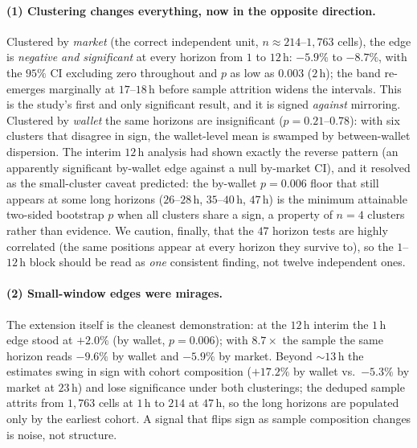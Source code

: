 \documentclass[11pt]{article}
\begin{document}
\paragraph{(1) Clustering changes everything, now in the opposite direction.} Clustered by
\emph{market} (the correct independent unit, $n\approx214$--$1{,}763$ cells), the edge is
\emph{negative and significant} at every horizon from $1$ to $12$\,h: $-5.9\%$ to $-8.7\%$, with
the $95\%$ CI excluding zero throughout and $p$ as low as $0.003$ ($2$\,h); the band re-emerges
marginally at $17$--$18$\,h before sample attrition widens the intervals. This is the study's
first and only significant result, and it is signed \emph{against} mirroring. Clustered by
\emph{wallet} the same horizons are insignificant ($p=0.21$--$0.78$): with six clusters that
disagree in sign, the wallet-level mean is swamped by between-wallet dispersion. The interim
$12$\,h analysis had shown exactly the reverse pattern (an apparently significant by-wallet
edge against a null by-market CI), and it resolved as the small-cluster caveat predicted: the
by-wallet $p=0.006$ floor that still appears at some long horizons ($26$--$28$\,h,
$35$--$40$\,h, $47$\,h) is the minimum attainable two-sided bootstrap $p$ when all clusters
share a sign, a property of $n{=}4$ clusters rather than evidence. We caution, finally, that
the $47$ horizon tests are highly correlated (the same positions appear at every horizon they
survive to), so the $1$--$12$\,h block should be read as \emph{one} consistent finding, not
twelve independent ones.

\paragraph{(2) Small-window edges were mirages.} The extension itself is the cleanest
demonstration: at the $12$\,h interim the $1$\,h edge stood at $+2.0\%$ (by wallet, $p=0.006$);
with $8.7\times$ the sample the same horizon reads $-9.6\%$ by wallet and $-5.9\%$ by market.
Beyond ${\sim}13$\,h the estimates swing in sign with cohort composition ($+17.2\%$ by wallet
vs.\ $-5.3\%$ by market at $23$\,h) and lose significance under both clusterings; the deduped
sample attrits from $1{,}763$ cells at $1$\,h to $214$ at $47$\,h, so the long horizons are
populated only by the earliest cohort. A signal that flips sign as sample composition changes
is noise, not structure.
\end{document}
